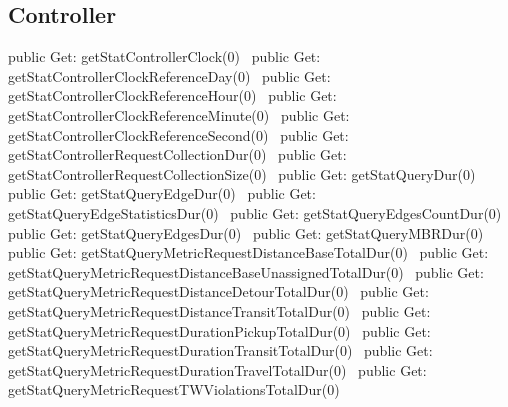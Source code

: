 \subsection{Controller}
\nwenddocs{}\plusendmoddef
public \LA{}Get: getStatControllerClock(0)~{\nwtagstyle{}}\RA{}
public \LA{}Get: getStatControllerClockReferenceDay(0)~{\nwtagstyle{}}\RA{}
public \LA{}Get: getStatControllerClockReferenceHour(0)~{\nwtagstyle{}}\RA{}
public \LA{}Get: getStatControllerClockReferenceMinute(0)~{\nwtagstyle{}}\RA{}
public \LA{}Get: getStatControllerClockReferenceSecond(0)~{\nwtagstyle{}}\RA{}
public \LA{}Get: getStatControllerRequestCollectionDur(0)~{\nwtagstyle{}}\RA{}
public \LA{}Get: getStatControllerRequestCollectionSize(0)~{\nwtagstyle{}}\RA{}
public \LA{}Get: getStatQueryDur(0)~{\nwtagstyle{}}\RA{}
public \LA{}Get: getStatQueryEdgeDur(0)~{\nwtagstyle{}}\RA{}
public \LA{}Get: getStatQueryEdgeStatisticsDur(0)~{\nwtagstyle{}}\RA{}
public \LA{}Get: getStatQueryEdgesCountDur(0)~{\nwtagstyle{}}\RA{}
public \LA{}Get: getStatQueryEdgesDur(0)~{\nwtagstyle{}}\RA{}
public \LA{}Get: getStatQueryMBRDur(0)~{\nwtagstyle{}}\RA{}
public \LA{}Get: getStatQueryMetricRequestDistanceBaseTotalDur(0)~{\nwtagstyle{}}\RA{}
public \LA{}Get: getStatQueryMetricRequestDistanceBaseUnassignedTotalDur(0)~{\nwtagstyle{}}\RA{}
public \LA{}Get: getStatQueryMetricRequestDistanceDetourTotalDur(0)~{\nwtagstyle{}}\RA{}
public \LA{}Get: getStatQueryMetricRequestDistanceTransitTotalDur(0)~{\nwtagstyle{}}\RA{}
public \LA{}Get: getStatQueryMetricRequestDurationPickupTotalDur(0)~{\nwtagstyle{}}\RA{}
public \LA{}Get: getStatQueryMetricRequestDurationTransitTotalDur(0)~{\nwtagstyle{}}\RA{}
public \LA{}Get: getStatQueryMetricRequestDurationTravelTotalDur(0)~{\nwtagstyle{}}\RA{}
public \LA{}Get: getStatQueryMetricRequestTWViolationsTotalDur(0)~{\nwtagstyle{}}\RA{}
